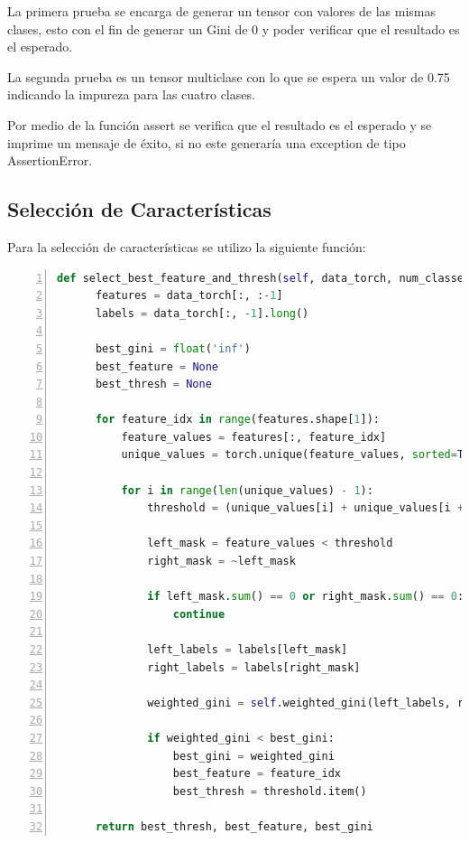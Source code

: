 \documentclass[12pt,a4paper]{article}
\begin{document}
La primera prueba se encarga de generar un tensor con valores de las mismas clases, esto con el fin de generar un Gini de 0
y poder verificar que el resultado es el esperado.

La segunda prueba es un tensor multiclase con lo que se espera un valor de 0.75 indicando la impureza para las cuatro clases.

Por medio de la función assert se verifica que el resultado es el esperado y se imprime un mensaje de éxito, si no este generaría
una exception de tipo AssertionError.

\subsection{Selección de Características}\label{subsec:seleccion-de-caracteristicas}

Para la selección de características se utilizo la siguiente función:

    \begin{lstlisting}[language=Python, numbers=left, basicstyle=\ttfamily\tiny,label={lst:lstlisting3}]
def select_best_feature_and_thresh(self, data_torch, num_classes=2):
      features = data_torch[:, :-1]
      labels = data_torch[:, -1].long()

      best_gini = float('inf')
      best_feature = None
      best_thresh = None

      for feature_idx in range(features.shape[1]):
          feature_values = features[:, feature_idx]
          unique_values = torch.unique(feature_values, sorted=True)

          for i in range(len(unique_values) - 1):
              threshold = (unique_values[i] + unique_values[i + 1]) / 2

              left_mask = feature_values < threshold
              right_mask = ~left_mask

              if left_mask.sum() == 0 or right_mask.sum() == 0:
                  continue

              left_labels = labels[left_mask]
              right_labels = labels[right_mask]

              weighted_gini = self.weighted_gini(left_labels, right_labels, num_classes)

              if weighted_gini < best_gini:
                  best_gini = weighted_gini
                  best_feature = feature_idx
                  best_thresh = threshold.item()

      return best_thresh, best_feature, best_gini
    \end{lstlisting}
\end{document}
